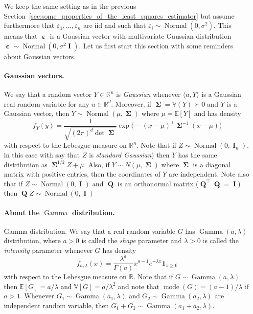 \documentclass[
	fontsize=11pt, %
	twoside=false, %
	numbers=noenddot, %
]{kaobook}
\DeclareMathOperator{\bI}{{\boldsymbol I}}
\DeclareMathOperator{\bQ}{{\boldsymbol Q}}
\DeclareMathOperator{\beps}{\boldsymbol \varepsilon}
\DeclareMathOperator{\bSigma}{\boldsymbol \Sigma}
\DeclareMathOperator{\mode}{mode}
\DeclareMathOperator{\gam}{Gamma}
\DeclareMathOperator{\nor}{Normal}
\newcommand{\eps}{\varepsilon}
\newcommand{\E}{\mathbb E}
\newcommand{\R}{\mathbb R}
\newcommand{\var}{\mathbb V}
\newcommand{\ind}[1]{\mathbf 1_{#1}}
\newcommand{\inr}[1]{\langle #1 \rangle}
\begin{document}
We keep the same setting as in the previous Section~\ref{sec:some_properties_of_the_least_squares_estimator} but assume furthermore that $\eps_1, \ldots, \eps_n$ are iid and such that $\eps_i \sim \nor(0, \sigma^2)$.
This means that $\beps$ is a Gaussian vector with multivariate Gaussian distribution $\beps \sim \nor(0, \sigma^2 \bI)$.
Let us first start this section with some reminders about Gaussian vectors.

\paragraph{Gaussian vectors.} %

We say that a random vector $Y \in \R^n$ is \emph{Gaussian} whenever $\inr{u, Y}$ is a Gaussian real random variable for any $u \in \R^d$.
Moreover, if $\bSigma = \var(Y) \succ 0$ and $Y$ is a Gaussian vector, then $Y \sim \nor(\mu, \bSigma)$ where $\mu = \E[Y]$ and has density
\begin{equation*}
	f_Y(y) = \frac{1}{\sqrt{(2 \pi)^d \det \bSigma}} \exp \Big( - (x - \mu)^\top \bSigma^{-1} (x - \mu) \Big)
\end{equation*}
with respect to the Lebesgue measure on $\R^n$.
Note that if $Z \sim \nor(0, \bI_n)$, in this case with say that $Z$ is \emph{standard Gaussian}) then $Y$ has the same distribution as $\bSigma^{1/2} Z + \mu$.
Also, if $Y \sim N(\mu, \bSigma)$ where $\bSigma$ is a diagonal matrix with positive entries, then the coordinates of $Y$ are independent.
Note also that if $Z \sim \nor(0, \bI)$ and $\bQ$ is an orthonormal matrix ($\bQ^\top \bQ = \bI$) then $\bQ Z \sim \nor(0, \bI)$

\paragraph{About the $\gam$ distribution.} %

Gamma distribution. We say that a real random variable $G$ has $\gam(a, \lambda)$ distribution, where $a > 0$ is called the \emph{shape} parameter and $\lambda > 0$ is called the \emph{intensity} parameter whenever $G$ has density
\begin{equation*}
	f_{a, \lambda}(x) = \frac{\lambda^a}{\Gamma(a)} x^{a - 1} e^{-\lambda x} \ind{x \geq 0}
\end{equation*}
with respect to the Lebesgue measure on $\R$.
Note that if $G \sim \gam(a, \lambda)$ then $\E[G] = a / \lambda$ and $\var[G] = a / \lambda^2$ and note that $\mode(G) = (a - 1) / \lambda$ if $a > 1$.
Whenever $G_1 \sim \gam(a_1, \lambda)$ and $G_2 \sim \gam(a_2, \lambda)$ are independent random variable, then $G_1 + G_2 \sim \gam(a_1 + a_2, \lambda)$. 
\end{document}
